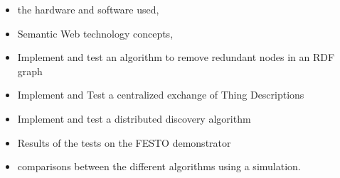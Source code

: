 \begin{itemize}
  \item the hardware and software used,
  \item Semantic Web technology concepts,
  \item Implement and test an algorithm to remove redundant nodes in an RDF graph
  \item Implement and Test a centralized exchange of Thing Descriptions
  \item Implement and test a distributed discovery algorithm
  \item Results of the tests on the FESTO demonstrator
  \item comparisons between the different algorithms using a simulation.
\end{itemize}
